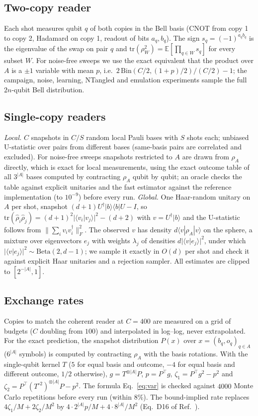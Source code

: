 \documentclass[11pt,a4paper]{article}
\begin{document}
\subsection{Two-copy reader}
Each shot measures qubit $q$ of both copies in the Bell basis (CNOT from copy 1 to copy 2, Hadamard
on copy 1, readout of bits $a_q,b_q$). The sign $s_q=(-1)^{a_qb_q}$ is the eigenvalue of the swap
on pair $q$ and $\mathrm{tr}(\rho_W^2)=\mathbb{E}[\prod_{q\in W}s_q]$ for every subset $W$. For
noise-free sweeps we use the exact equivalent that the product over $A$ is a $\pm1$ variable with
mean $p$, i.e.\ $2\,\mathrm{Bin}(C/2,(1+p)/2)/(C/2)-1$; the campaign, noise, learning, NTangled and
emulation experiments sample the full $2n$-qubit Bell distribution.

\subsection{Single-copy readers}
\emph{Local.} $C$ snapshots in $C/S$ random local Pauli bases with $S$ shots each; unbiased
U-statistic over pairs from different bases (same-basis pairs are correlated and excluded). For
noise-free sweeps snapshots restricted to $A$ are drawn from $\rho_A$ directly, which is exact for
local measurements, using the exact outcome table of all $3^{|A|}$ bases computed by contracting
$\rho_A$ qubit by qubit; an oracle checks the table against explicit unitaries and the fast
estimator against the reference implementation (to $10^{-9}$) before every run. \emph{Global.}
One Haar-random unitary on $A$ per shot, snapshot $(d+1)U^\dagger|b\rangle\langle b|U-I$, so
$\mathrm{tr}(\hat\rho_i\hat\rho_j)=(d+1)^2|\langle v_i|v_j\rangle|^2-(d+2)$ with
$v=U^\dagger|b\rangle$ and the U-statistic follows from $\|\sum_iv_iv_i^\dagger\|_F^2$. The observed
$v$ has density $d\langle v|\rho_A|v\rangle$ on the sphere, a mixture over eigenvectors $e_j$ with
weights $\lambda_j$ of densities $d|\langle v|e_j\rangle|^2$, under which
$|\langle v|e_j\rangle|^2\sim\mathrm{Beta}(2,d-1)$; we sample it exactly in $O(d)$ per shot and check
it against explicit Haar unitaries and a rejection sampler. All estimates are clipped to
$[2^{-|A|},1]$.

\subsection{Exchange rates}
Copies to match the coherent reader at $C=400$ are measured on a grid of budgets ($C$ doubling from
$100$) and interpolated in log--log, never extrapolated. For the exact prediction, the snapshot
distribution $P(x)$ over $x=(b_q,o_q)_{q\in A}$ ($6^{|A|}$ symbols) is computed by contracting
$\rho_A$ with the basis rotations. With the single-qubit kernel $T$ ($5$ for equal basis and
outcome, $-4$ for equal basis and different outcome, $1/2$ otherwise), $g=T^{\otimes|A|}P$,
$p=P^\top g$, $\zeta_1=P^\top g^2-p^2$ and $\zeta_2=P^\top(T^{\circ2})^{\otimes|A|}P-p^2$. The
formula Eq.~\eqref{eq:var} is checked against $4000$ Monte Carlo repetitions before every run
(within $8\%$). The bound-implied rate replaces $4\zeta_1/M+2\zeta_2/M^2$ by
$4\cdot2^{|A|}p/M+4\cdot8^{|A|}/M^2$ (Eq.~D16 of Ref.~).
\end{document}
